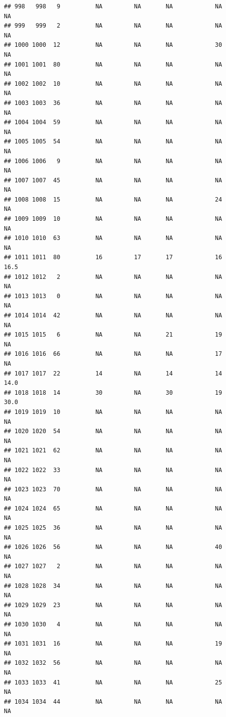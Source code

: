 \documentclass[man]{apa6}
\begin{document}
\begin{verbatim}
## 998   998   9          NA         NA       NA            NA       NA
## 999   999   2          NA         NA       NA            NA       NA
## 1000 1000  12          NA         NA       NA            30       NA
## 1001 1001  80          NA         NA       NA            NA       NA
## 1002 1002  10          NA         NA       NA            NA       NA
## 1003 1003  36          NA         NA       NA            NA       NA
## 1004 1004  59          NA         NA       NA            NA       NA
## 1005 1005  54          NA         NA       NA            NA       NA
## 1006 1006   9          NA         NA       NA            NA       NA
## 1007 1007  45          NA         NA       NA            NA       NA
## 1008 1008  15          NA         NA       NA            24       NA
## 1009 1009  10          NA         NA       NA            NA       NA
## 1010 1010  63          NA         NA       NA            NA       NA
## 1011 1011  80          16         17       17            16     16.5
## 1012 1012   2          NA         NA       NA            NA       NA
## 1013 1013   0          NA         NA       NA            NA       NA
## 1014 1014  42          NA         NA       NA            NA       NA
## 1015 1015   6          NA         NA       21            19       NA
## 1016 1016  66          NA         NA       NA            17       NA
## 1017 1017  22          14         NA       14            14     14.0
## 1018 1018  14          30         NA       30            19     30.0
## 1019 1019  10          NA         NA       NA            NA       NA
## 1020 1020  54          NA         NA       NA            NA       NA
## 1021 1021  62          NA         NA       NA            NA       NA
## 1022 1022  33          NA         NA       NA            NA       NA
## 1023 1023  70          NA         NA       NA            NA       NA
## 1024 1024  65          NA         NA       NA            NA       NA
## 1025 1025  36          NA         NA       NA            NA       NA
## 1026 1026  56          NA         NA       NA            40       NA
## 1027 1027   2          NA         NA       NA            NA       NA
## 1028 1028  34          NA         NA       NA            NA       NA
## 1029 1029  23          NA         NA       NA            NA       NA
## 1030 1030   4          NA         NA       NA            NA       NA
## 1031 1031  16          NA         NA       NA            19       NA
## 1032 1032  56          NA         NA       NA            NA       NA
## 1033 1033  41          NA         NA       NA            25       NA
## 1034 1034  44          NA         NA       NA            NA       NA

\end{verbatim}
\end{document}
